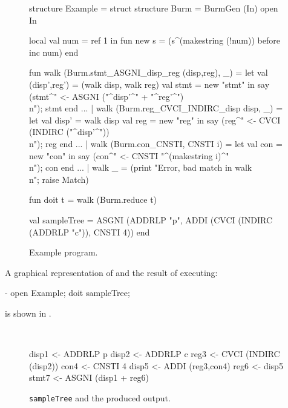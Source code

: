 \begin{figure}
\begin{centercode}
structure Example = struct 
  structure Burm = BurmGen (In)
  open In

  local val num = ref 1 in
    fun new s = (s^(makestring (!num)) before inc num)
  end

  fun walk (Burm.stmt_ASGNI_disp_reg (disp,reg), _) =
        let
          val (disp',reg') = (walk disp, walk reg)
          val stmt = new "stmt"
        in
          say (stmt^" <- ASGNI ("^disp'^" + "^reg'^")\\n"); stmt
        end
    ...
    | walk (Burm.reg_CVCI_INDIRC_disp disp, _) =
	let
	  val disp' = walk disp
	  val reg = new "reg"
	in
	  say (reg^" <- CVCI (INDIRC ("^disp'^"))\\n"); reg
	end
    ...
    | walk (Burm.con_CNSTI, CNSTI i) =
        let
          val con = new "con"
        in
          say (con^" <- CNSTI "^(makestring i)^"\\n"); con
        end
    ...
    | walk _ = (print "Error, bad match in walk\\n"; raise Match)


  fun doit t = walk (Burm.reduce t)

  val sampleTree = ASGNI (ADDRLP "p",
                          ADDI (CVCI (INDIRC (ADDRLP "c")),
                                CNSTI 4))
end
\end{centercode}
 \caption{Example program.}
 \label{ex:prog}
\end{figure}

A graphical representation of  and the result of
executing: 
\begin{code}
    - open Example; doit sampleTree;
\end{code}
is shown in .

\begin{figure}

\hspace*{\fill}
\hbox{
 \def\epsfsize#1#2{0.8#1}
}
\hspace*{\fill}

\vskip 1in

\begin{centercode}
disp1 <- ADDRLP p
disp2 <- ADDRLP c
reg3 <- CVCI (INDIRC (disp2))
con4 <- CNSTI 4
disp5 <- ADDI (reg3,con4)
reg6 <- disp5
stmt7 <- ASGNI (disp1 + reg6)
\end{centercode}
 \caption{{\tt sampleTree} and the produced output.}
 \label{ex:output}
\end{figure}

